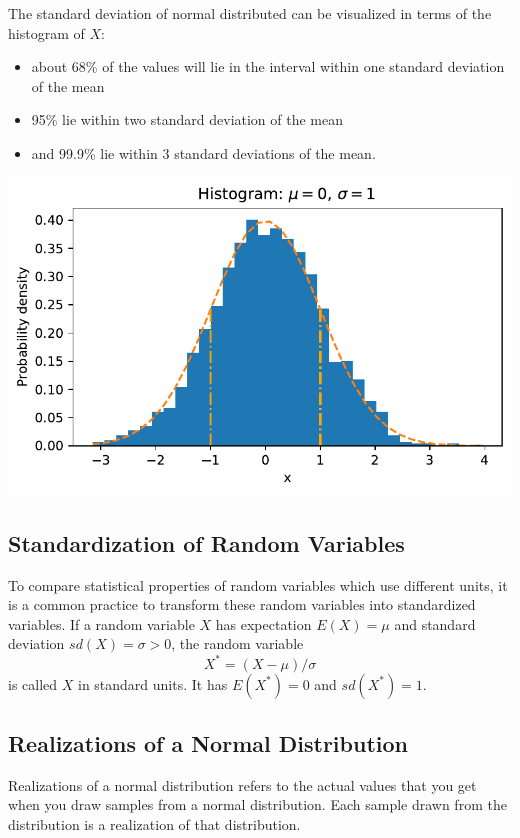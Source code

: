 \documentclass[
  letterpaper,
  DIV=11,
  numbers=noendperiod]{scrreprt}
\providecommand{\tightlist}{%
  \setlength{\itemsep}{0pt}\setlength{\parskip}{0pt}}\usepackage{longtable,booktabs,array}
\begin{document}
The standard deviation of normal distributed can be visualized in terms
of the histogram of \(X\):

\begin{itemize}
\tightlist
\item
  about 68\% of the values will lie in the interval within one standard
  deviation of the mean
\item
  95\% lie within two standard deviation of the mean
\item
  and 99.9\% lie within 3 standard deviations of the mean.
\end{itemize}

\includegraphics{006_num_gp_files/figure-pdf/cell-21-output-1.pdf}

\subsection{Standardization of Random
Variables}\label{standardization-of-random-variables}

To compare statistical properties of random variables which use
different units, it is a common practice to transform these random
variables into standardized variables. If a random variable \(X\) has
expectation \(E(X) = \mu\) and standard deviation \(sd(X) = \sigma >0\),
the random variable \[
X^{\ast} = (X-\mu)/\sigma
\] is called \(X\) in standard units. It has \(E(X^{\ast}) = 0\) and
\(sd(X^{\ast}) =1\).

\subsection{Realizations of a Normal
Distribution}\label{realizations-of-a-normal-distribution}

Realizations of a normal distribution refers to the actual values that
you get when you draw samples from a normal distribution. Each sample
drawn from the distribution is a realization of that distribution.
\end{document}
